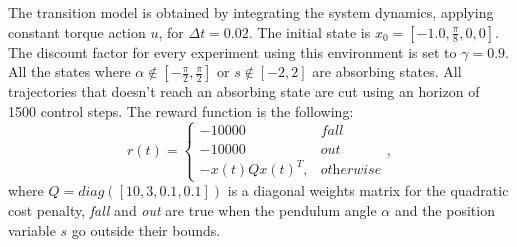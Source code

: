 The transition model is obtained by integrating the system dynamics, applying constant torque action $u$, for $\Delta t=0.02$.
The initial state is $x_0=[-1.0, \frac{\pi}{8}, 0, 0]$. 
The discount factor for every experiment using this environment is set to $\gamma=0.9$.
All the states where $\alpha\not\in[-\frac{\pi}{2}, \frac{\pi}{2}]$ or $s\not\in[-2, 2]$ are absorbing states. All trajectories that doesn't reach an absorbing state are cut using an horizon of 1500 control steps.
The reward function is the following: 
\begin{equation*}
	r(t)=\begin{cases}
		-10000 & \textit{fall}\\
		-10000 & \textit{out}\\
		-x(t)Qx(t)^T, & \textit{otherwise}
	\end{cases},
\end{equation*}
where $Q=diag([10, 3, 0.1, 0.1])$ is a diagonal weights matrix for the quadratic cost penalty,  \textit{fall} and \textit{out} are true when the pendulum angle $\alpha$  and the position variable $s$ go outside their bounds.


